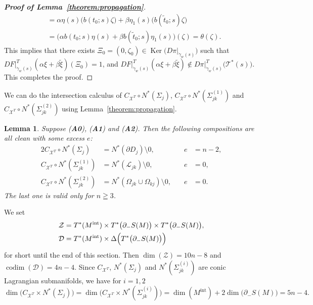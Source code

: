 \documentclass[a4paper,11pt,reqno]{amsart}
\numberwithin{equation}{section}
\newtheorem{lemma}[theorem]{Lemma}
\theoremstyle{definition}
\theoremstyle{remark}
\begin{document}
\begin{proof}[{\bf Proof of Lemma~\ref{theorem:propagation}}]
\begin{align*}
& =
  \alpha\eta(s)\bigl(b(t_0;s)\zeta\bigr)
  +
  \beta\eta_1(s)\bigl(b(\tilde{t}_0;s)\zeta\bigr) 
\\
& = 
  \bigl(
  \alpha b(t_0;s) \eta(s) 
  + 
  \beta b(\tilde{t}_0;s) \eta_1(s)
  \bigr)
  (\zeta)
  =
  \theta(\zeta). 
\end{align*}
%
%
This implies that there exists 
$\Xi_0=(0,\zeta_0) \in \operatorname{Ker}\bigl(D\pi\vert_{\dot{\gamma}_w(s)}\bigr)$ such that 
$DF\vert^T_{\dot{\gamma}_w(s)}(\alpha\xi+\beta\tilde{\xi})(\Xi_0)=1$, 
and 
$DF\vert^T_{\dot{\gamma}_w(s)}(\alpha\xi+\beta\tilde{\xi}) \not\in D\pi\vert^T_{\dot{\gamma}_w(s)}\bigl(\mathcal{T}^\ast(s)\bigr)$. 
This completes the proof.
\end{proof}
%
%
\par
%
%
We can do the intersection calculus of 
$C_{\mathcal{X}^T}{\circ}N^\ast(\Sigma_j)$, 
$C_{\mathcal{X}^T}{\circ}N^\ast(\Sigma_{jk}^{(1)})$ 
and 
$C_{\mathcal{X}^T}{\circ}N^\ast(\Sigma_{jk}^{(2)})$ 
using Lemma~\ref{theorem:propagation}.   
%
%
\begin{lemma}
\label{theorem:compositionT}
Suppose 
{\rm ({\bf A0})}, 
{\rm ({\bf A1})} 
and  
{\rm ({\bf A2})}. 
Then the following compositions are all clean with some excess $e${\rm :}
%
%
\begin{alignat*}{2}
  C_{\mathcal{X}^T}{\circ}N^\ast(\Sigma_j)
& =
  N^\ast(\partial{D_j})\setminus0,
& \quad
  e
& =
  n-2,
\\ 
  C_{\mathcal{X}^T}{\circ}N^\ast(\Sigma_{jk}^{(1)})
& =
  N^\ast(\mathcal{L}_{jk})\setminus0,
& \quad
  e
& =
  0,
\\ 
  C_{\mathcal{X}^T}{\circ}N^\ast(\Sigma_{jk}^{(2)})
& =
  N^\ast(\Omega_{jk}\cup\Omega_{kj})\setminus0,
& \quad
  e
& =
  0.
\end{alignat*}
%
%
The last one is valid only for $n\geqq3$. 
\end{lemma}
%
%
We set 
%
%
\begin{align*}
  \mathcal{Z}
& =
  T^\ast(M^\text{int})
  \times
  T^\ast\bigl(\partial_-S(M)\bigr)
  \times
  T^\ast\bigl(\partial_-S(M)\bigr),
\\
  \mathcal{D}
& =
  T^\ast(M^\text{int})
  \times
  \Delta\Bigl(T^\ast\bigl(\partial_-S(M)\bigr)\Bigr)
\end{align*}
%
%
for short until the end of this section.  
Then $\operatorname{dim}(\mathcal{Z})=10n-8$ 
and $\operatorname{codim}(\mathcal{D})=4n-4$. 
Since 
$C_{\mathcal{X}^T}$, 
$N^\ast(\Sigma_j)$ 
and 
$N^\ast(\Sigma_{jk}^{(i)})$ 
are conic Lagrangian submanifolds, we have for $i=1,2$
%
%
$$
\operatorname{dim}
\bigl(C_{\mathcal{X}^T}{\times}N^\ast(\Sigma_j)\bigr)
=
\operatorname{dim}
\bigl(C_{\mathcal{X}^T}{\times}N^\ast(\Sigma_{jk}^{(i)})\bigr)
=
\operatorname{dim}(M^\text{int})
+
2
\operatorname{dim}\bigl(\partial_-S(M)\bigr)
=
5n-4.
$$
\end{document}
